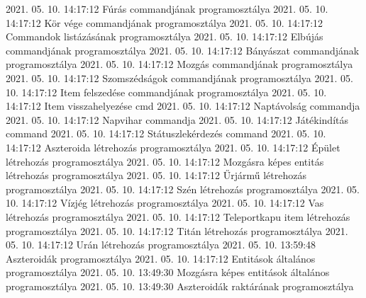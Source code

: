  {2021. 05. 10. 14:17:12} {Fúrás commandjának programosztálya}
 {2021. 05. 10. 14:17:12} {Kör vége commandjának programosztálya
 {2021. 05. 10. 14:17:12} {Commandok listázásának programosztálya}
 {2021. 05. 10. 14:17:12} {Elbújás commandjának programosztálya}
 {2021. 05. 10. 14:17:12} {Bányászat commandjának programosztálya}
 {2021. 05. 10. 14:17:12} {Mozgás commandjának programosztálya}
 {2021. 05. 10. 14:17:12} {Szomszédságok commandjának programosztálya}
 {2021. 05. 10. 14:17:12} {Item felszedése commandjának programosztálya}
 {2021. 05. 10. 14:17:12} {Item visszahelyezése cmd}
 {2021. 05. 10. 14:17:12} {{Naptávolság commandja}
 {2021. 05. 10. 14:17:12} {{Napvihar commandja}
 {2021. 05. 10. 14:17:12} {Játékindítás command}
 {2021. 05. 10. 14:17:12} {Státuszlekérdezés command}
 {2021. 05. 10. 14:17:12} {Aszteroida létrehozás programosztálya}
 {2021. 05. 10. 14:17:12} {Épület létrehozás programosztálya}
 {2021. 05. 10. 14:17:12} {Mozgásra képes entitás létrehozás programosztálya}
 {2021. 05. 10. 14:17:12} {Űrjármű létrehozás programosztálya}
 {2021. 05. 10. 14:17:12} {Szén létrehozás programosztálya}
 {2021. 05. 10. 14:17:12} {Vízjég létrehozás programosztálya}
 {2021. 05. 10. 14:17:12} {Vas létrehozás programosztálya}
 {2021. 05. 10. 14:17:12} {Teleportkapu item létrehozás programosztálya}
 {2021. 05. 10. 14:17:12} {Titán létrehozás programosztálya}
 {2021. 05. 10. 14:17:12} {Urán létrehozás programosztálya}
 {2021. 05. 10. 13:59:48} {Aszteroidák programosztálya}
 {2021. 05. 10. 14:17:12} {Entitások általános programosztálya}
 {2021. 05. 10. 13:49:30} {Mozgásra képes entitások általános programosztálya}
 {2021. 05. 10. 13:49:30} {Aszteroidák raktárának programosztálya}
}}}
